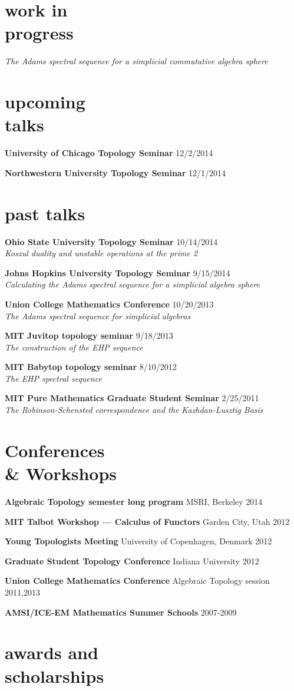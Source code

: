 \documentclass[margin,line]{resume}
\newcommand{\CVsection}[1]{\section{\mysidestyle #1}}
\newcommand{\entry}[3]{\textbf{#1} #2 \hfill {#3}
           
\vspace{-2.7mm}}
\newcommand{\twolineentry}[4]{\textbf{#1} #2 \hfill {#4}\\%
#3
           
\vspace{-2.7mm}}
\newcommand{\FINALentry}[3]{\textbf{#1} #2 \hfill {#3}}
\newcommand{\FINALtwolineentry}[4]{\textbf{#1} #2 \hfill {#4}\\%
#3}
\begin{document}
\begin{resume}
\CVsection{work in \\progress}
\FINALentry{\hspace{-.275em}}{\emph{The Adams spectral sequence for a simplicial commutative algebra
sphere}}{}


\CVsection{upcoming \\talks}
\entry{University of Chicago Topology Seminar}{}{12/2/2014}
\entry{Northwestern University Topology Seminar}{}{12/1/2014}
\vspace{-2mm}
\CVsection{past talks}
\twolineentry{Ohio State University Topology Seminar}{}{\emph{Koszul duality and unstable operations at the prime 2}}{10/14/2014}
\twolineentry{Johns Hopkins University Topology Seminar}{}{\emph{Calculating the Adams spectral sequence for a simplicial algebra sphere}}{9/15/2014}
\twolineentry{Union College Mathematics Conference}{}{\emph{The Adams spectral sequence for simplicial algebras}}{10/20/2013}
\twolineentry{MIT Juvitop topology seminar}{}{\emph{The construction of the EHP sequence}}{9/18/2013}
\twolineentry{MIT Babytop topology seminar}{}{\emph{The EHP spectral sequence}}{8/10/2012}
\FINALtwolineentry{MIT Pure Mathematics Graduate Student Seminar}{}{\emph{The Robinson-Schensted correspondence and the Kazhdan-Lusztig Basis}}{2/25/2011}


\CVsection{Conferences \\ \& Workshops}

\entry{Algebraic Topology semester long program}{MSRI, Berkeley}{2014}
\entry{MIT Talbot Workshop --- Calculus of Functors}{Garden City, Utah}{2012}
\entry{Young Topologists Meeting}{University of Copenhagen, Denmark}{2012}
\entry{Graduate Student Topology Conference}{Indiana University}{2012}
\entry{Union College Mathematics Conference}{Algebraic Topology session}{2011,2013}
\FINALentry{AMSI/ICE-EM Mathematics Summer Schools}{}%
{2007-2009}


\CVsection{awards and\\scholarships} 


\end{resume}
\end{document}
